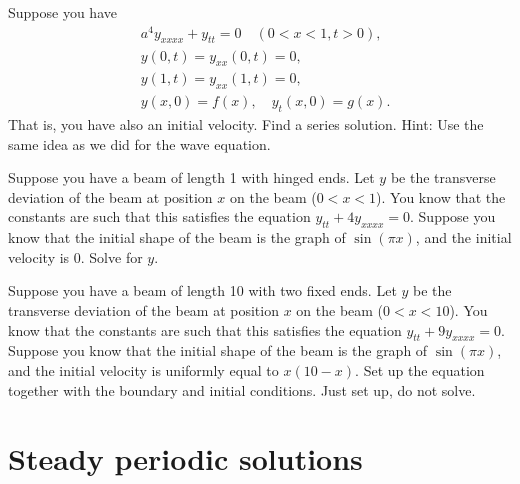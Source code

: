 \begin{exercise}
Suppose you have 
\begin{equation*}
\begin{aligned}
& a^4 y_{xxxx} + y_{tt} = 0 \quad (0 < x < 1, t > 0) , \\
& y(0,t) = y_{xx}(0,t) = 0,\\
& y(1,t) = y_{xx}(1,t) = 0 ,\\
& y(x,0) = f(x), \quad y_{t}(x,0) = g(x) .
\end{aligned}
\end{equation*}
That is, you have also an initial velocity.  Find a series solution.  Hint:
Use the same idea as we did for the wave equation.
\end{exercise}

\setcounter{exercise}{100}

\begin{exercise}
Suppose you have a beam of length 1 with hinged ends.  Let $y$ be the
transverse deviation of the beam at position $x$ on the beam ($0 < x < 1$).
You know that the
constants are such that this satisfies the equation $y_{tt} + 4 y_{xxxx} =
0$.   Suppose you know that the initial shape of the beam is the graph of
$\sin (\pi x)$, and the initial velocity is 0.  Solve for $y$.
\end{exercise}

\begin{exercise}
Suppose you have a beam of length 10 with two fixed ends.  Let $y$ be the
transverse deviation of the beam at position $x$ on the beam ($0 < x < 10$).
You know that the
constants are such that this satisfies the equation $y_{tt} + 9 y_{xxxx} =
0$.   Suppose you know that the initial shape of the beam is the graph of
$\sin(\pi x)$, and the initial velocity is uniformly equal to $x(10-x)$.
Set up the equation together with the
boundary and initial conditions.  Just set up, do not solve.
\end{exercise}


\sectionnewpage
\section{Steady periodic solutions}
\label{sps:section}

